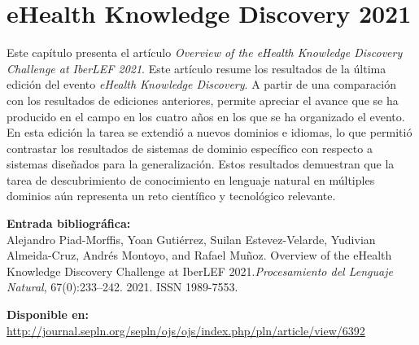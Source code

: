 
\chapter[eHealth Knowledge Discovery 2021: \textit{Overview of the eHealth Knowledge DiscoveryChallenge at IberLEF 2021}]{eHealth Knowledge Discovery 2021}
\label{Chap:eHealthKD21}

Este capítulo presenta el artículo \textit{Overview of the eHealth Knowledge Discovery Challenge at IberLEF 2021}.
Este artículo resume los resultados de la última edición del evento \textit{eHealth Knowledge Discovery}.
A partir de una comparación con los resultados de ediciones anteriores, permite apreciar el avance que se ha producido en el campo en los cuatro años en los que se ha organizado el evento.
En esta edición la tarea se extendió a nuevos dominios e idiomas, lo que permitió contrastar los resultados de sistemas de dominio específico con respecto a sistemas diseñados para la generalización.
Estos resultados demuestran que la tarea de descubrimiento de conocimiento en lenguaje natural en múltiples dominios aún representa un reto científico y tecnológico relevante.

\BlankLine
\noindent \textbf{Entrada bibliográfica:}\\
Alejandro Piad-Morffis, Yoan Gutiérrez, Suilan Estevez-Velarde, Yudivian Almeida-Cruz, Andrés Montoyo, and Rafael Muñoz. Overview of the eHealth Knowledge Discovery Challenge at IberLEF 2021.\textit{Procesamiento del Lenguaje Natural}, 67(0):233--242. 2021. ISSN 1989-7553.

\BlankLine
\noindent \textbf{Disponible en:} \url{http://journal.sepln.org/sepln/ojs/ojs/index.php/pln/article/view/6392}
